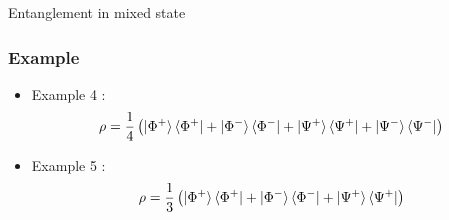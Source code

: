 \documentclass[9pt]{beamer}
\begin{document}
\begin{section}{Entanglement in mixed state}
\begin{frame}
        \end{frame}

        \begin{frame}
            \frametitle{Example}
            \begin{itemize}
                \item Example 4 : 
                \begin{equation*}
                    \rho = \frac{1}{4} \left( \ket{\Phi^+} \bra{\Phi^+}  +  \ket{\Phi^-} \bra{\Phi^-}  + \ket{\Psi^+} \bra{\Psi^+}  +  \ket{\Psi^-} \bra{\Psi^-} \right)
                \end{equation*}
                \item Example 5 :
                \begin{equation*}
                    \rho = \frac{1}{3} \left( \ket{\Phi^+}\bra{\Phi^+} + \ket{\Phi^-} \bra{\Phi^-} + \ket{\Psi^+} \bra{\Psi^+} \right)
                \end{equation*}
            \end{itemize}
        \end{frame}


\end{section}
\end{document}
